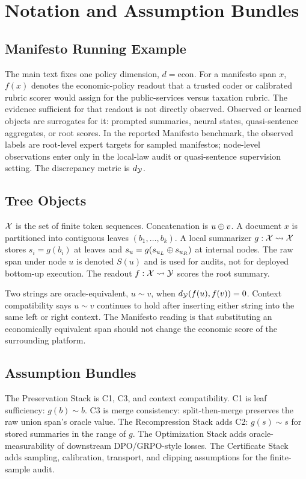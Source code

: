 \section{Notation and Assumption Bundles}\label{app:min-notation}

\subsection{Manifesto Running Example}

The main text fixes one policy dimension, $d=\mathrm{econ}$. For a manifesto
span $x$, $f(x)$ denotes the economic-policy readout that a trusted coder or
calibrated rubric scorer would assign for the public-services versus taxation
rubric. The evidence sufficient for that readout is not directly observed.
Observed or learned objects are surrogates for it: prompted summaries, neural
states, quasi-sentence aggregates, or root scores. In the reported Manifesto
benchmark, the observed labels are root-level expert targets for sampled
manifestos; node-level observations enter only in the local-law audit or
quasi-sentence supervision setting. The discrepancy metric is $d_{\mathcal{Y}}$.

\subsection{Tree Objects}

$\mathcal{X}$ is the set of finite token sequences. Concatenation is
$u\oplus v$. A document $x$ is partitioned into contiguous leaves
$(b_1,\ldots,b_k)$. A local summarizer $g:\mathcal{X}\rightsquigarrow\mathcal{X}$
stores $s_i=g(b_i)$ at leaves and
$s_u=g(s_{u_L}\oplus s_{u_R})$ at internal nodes. The raw span under node $u$
is denoted $S(u)$ and is used for audits, not for deployed bottom-up
execution. The readout $f:\mathcal{X}\rightsquigarrow\mathcal{Y}$ scores the root summary.

Two strings are oracle-equivalent, $u\sim v$, when
$d_{\mathcal{Y}}(f(u),f(v))=0$. Context compatibility says $u\sim v$
continues to hold after inserting either string into the same left or right
context. The Manifesto reading is that substituting an economically equivalent
span should not change the economic score of the surrounding platform.

\subsection{Assumption Bundles}

The Preservation Stack is C1, C3, and context compatibility. C1 is leaf
sufficiency: $g(b)\sim b$. C3 is merge consistency: split-then-merge preserves
the raw union span's oracle value. The Recompression Stack adds C2:
$g(s)\sim s$ for stored summaries in the range of $g$. The Optimization Stack
adds oracle-measurability of downstream DPO/GRPO-style losses. The Certificate
Stack adds sampling, calibration, transport, and clipping assumptions for the
finite-sample audit.

